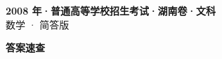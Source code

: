 \documentclass[zihao=-4, a4paper]{ctexart}
\begin{document}
\begin{center}
  {\Large\bfseries 2008 年·普通高等学校招生考试·湖南卷·文科}\\[4pt]
  {\large 数学 · 简答版}
\end{center}
\medskip
{}

\clearpage
{}
\begin{center}{\Large\bfseries 答案速查}\end{center}
\medskip

\end{document}
